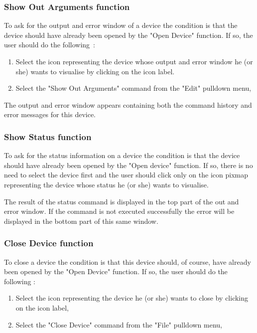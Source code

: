 \subsubsection{Show Out Arguments function}

To ask for the output and error window of a device the condition is that the 
device should have already been opened by the "Open Device" function. If so, 
the user should do the following~:
\begin{enumerate}
\item
Select the icon representing the device whose output and error window he (or 
she) wants to visualise by clicking on the icon label.
\item
Select the "Show Out Arguments" command from the "Edit" pulldown menu,
\end{enumerate}

The output and error window appears containing both the command history and 
error messages for this device. 

\subsubsection{Show Status function}
To ask for the status information on a device the condition is that the device
should have already been opened by the "Open device" function. If so, there is 
no need to select the device first and the user should click only on the icon
pixmap representing the device whose status he (or she) wants to visualise.

The result of the status command is displayed in the top part of the out and 
error window.
If the command is not executed successfully the error will be displayed in the
bottom part of this same window.

\subsubsection{Close Device function}
To close a device the condition is that this device should, of course, have
already been opened by the "Open Device" function. If so, the user should do the
following :
\begin{enumerate}
\item
Select the icon representing the device he (or she) wants to close by clicking
on the icon label,
\item
Select the "Close Device" command from the "File" pulldown menu,
\end{enumerate}

